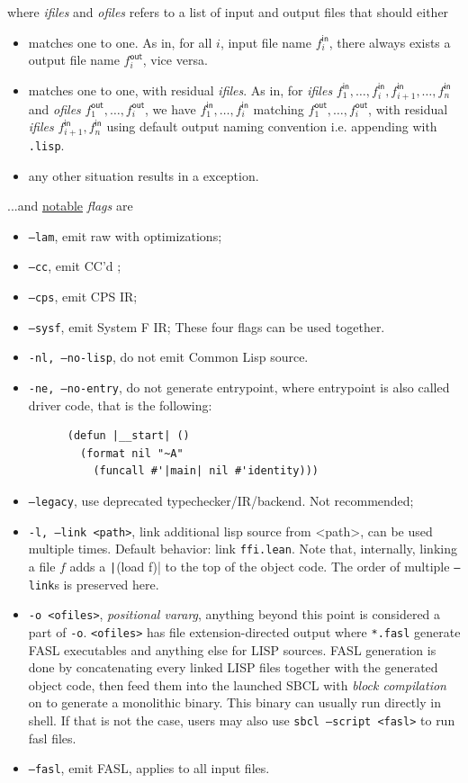 \documentclass[a4paper, 11pt]{article}
\theoremstyle{remark}\newtheorem*{remark}{Remark}
\theoremstyle{definition}\newtheorem*{definition}{Definition}
\begin{document}
where \textit{ifiles} and \textit{ofiles} refers to a list of input and output files that should either
\begin{itemize}
\item matches one to one. As in,
  for all $i$, input file name $f^\mathsf{in}_i$,
  there always exists a output file name $f^\mathsf{out}_i$, vice versa.
\item matches one to one, with residual \textit{ifiles}. As in,
  for \textit{ifiles}
  $f^\mathsf{in}_1,\dots,f^\mathsf{in}_i,f^\mathsf{in}_{i+1},\dots,f^\mathsf{in}_{n}$ and
  \textit{ofiles} $f^\mathsf{out}_1,\dots,f^\mathsf{out}_i$,
  we have $f^\mathsf{in}_1,\dots,f^\mathsf{in}_i$
  matching $f^\mathsf{out}_1,\dots,f^\mathsf{out}_i$,
  with residual \textit{ifiles} $f^\mathsf{in}_{i+1},f^\mathsf{in}_{n}$ using default
  output naming convention i.e. appending with \texttt{.lisp}.
\item any other situation results in a exception.
\end{itemize}
...and \underline{notable} \textit{flags} are
\begin{itemize}\itemsep0em
\item \texttt{--lam}, emit raw \Lambdair with optimizations;
\item \texttt{--cc}, emit CC'd \Lambdair;
\item \texttt{--cps}, emit CPS IR;
\item \texttt{--sysf}, emit System F IR; These four flags can be used together.
\item \texttt{-nl, --no-lisp}, do not emit Common Lisp source.
\item \texttt{-ne, --no-entry}, do not generate entrypoint, where entrypoint is also
  called driver code, that is the following:
    \begin{verbatim}
      (defun |__start| ()
        (format nil "~A"
          (funcall #'|main| nil #'identity)))
    \end{verbatim}
\item \texttt{--legacy}, use deprecated typechecker/IR/backend. Not recommended;
\item \texttt{-l, --link <path>}, link additional lisp source from <path>, can be used multiple times. Default behavior: link \texttt{ffi.lean}. Note that, internally, linking
  a file $f$ adds a \texttt|(load f)| to the top of the object code. The order of
  multiple \texttt{--link}s is preserved here.
\item \texttt{-o <ofiles>}, \emph{positional vararg}, anything beyond this point is considered a part of \texttt{-o}.
  \texttt{<ofiles>} has file extension-directed output where \texttt{*.fasl} generate FASL executables and anything else for LISP sources. FASL generation is done by concatenating
  every linked LISP files together with the generated object code, then feed them into
  the launched SBCL with \emph{block compilation} on to generate a monolithic binary.
  This binary can usually run directly in shell. If that is not the case, users may
  also use \texttt{sbcl --script <fasl>} to run fasl files.
\item \texttt{--fasl}, emit FASL, applies to all input files.
\end{itemize}
\end{document}
